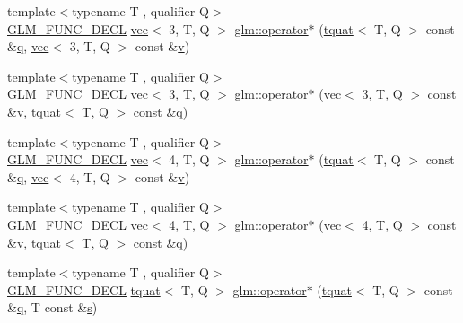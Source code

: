 \begin{DoxyCompactItemize}
\item 
{\footnotesize template$<$typename T , qualifier Q$>$ }\\\hyperlink{setup_8hpp_ab2d052de21a70539923e9bcbf6e83a51}{G\+L\+M\+\_\+\+F\+U\+N\+C\+\_\+\+D\+E\+CL} \hyperlink{structglm_1_1vec}{vec}$<$ 3, T, Q $>$ \hyperlink{group__gtc__quaternion_ga01cacfba4a28b21e7af7cdbb122c4ef9}{glm\+::operator$\ast$} (\hyperlink{structglm_1_1tquat}{tquat}$<$ T, Q $>$ const \&\hyperlink{_s_d_l__opengl_8h_a8fc1e7b9baaae687804c7eed46ca09c6}{q}, \hyperlink{structglm_1_1vec}{vec}$<$ 3, T, Q $>$ const \&\hyperlink{_s_d_l__opengl_8h_a10a82eabcb59d2fcd74acee063775f90}{v})
\item 
{\footnotesize template$<$typename T , qualifier Q$>$ }\\\hyperlink{setup_8hpp_ab2d052de21a70539923e9bcbf6e83a51}{G\+L\+M\+\_\+\+F\+U\+N\+C\+\_\+\+D\+E\+CL} \hyperlink{structglm_1_1vec}{vec}$<$ 3, T, Q $>$ \hyperlink{group__gtc__quaternion_ga97f1c7e2d4ae80aad5d8813aed7d860e}{glm\+::operator$\ast$} (\hyperlink{structglm_1_1vec}{vec}$<$ 3, T, Q $>$ const \&\hyperlink{_s_d_l__opengl_8h_a10a82eabcb59d2fcd74acee063775f90}{v}, \hyperlink{structglm_1_1tquat}{tquat}$<$ T, Q $>$ const \&\hyperlink{_s_d_l__opengl_8h_a8fc1e7b9baaae687804c7eed46ca09c6}{q})
\item 
{\footnotesize template$<$typename T , qualifier Q$>$ }\\\hyperlink{setup_8hpp_ab2d052de21a70539923e9bcbf6e83a51}{G\+L\+M\+\_\+\+F\+U\+N\+C\+\_\+\+D\+E\+CL} \hyperlink{structglm_1_1vec}{vec}$<$ 4, T, Q $>$ \hyperlink{group__gtc__quaternion_ga69d38a6ce6b49b97147c26274ada8911}{glm\+::operator$\ast$} (\hyperlink{structglm_1_1tquat}{tquat}$<$ T, Q $>$ const \&\hyperlink{_s_d_l__opengl_8h_a8fc1e7b9baaae687804c7eed46ca09c6}{q}, \hyperlink{structglm_1_1vec}{vec}$<$ 4, T, Q $>$ const \&\hyperlink{_s_d_l__opengl_8h_a10a82eabcb59d2fcd74acee063775f90}{v})
\item 
{\footnotesize template$<$typename T , qualifier Q$>$ }\\\hyperlink{setup_8hpp_ab2d052de21a70539923e9bcbf6e83a51}{G\+L\+M\+\_\+\+F\+U\+N\+C\+\_\+\+D\+E\+CL} \hyperlink{structglm_1_1vec}{vec}$<$ 4, T, Q $>$ \hyperlink{group__gtc__quaternion_ga16c91c9dc2f0346faa3742888339b11d}{glm\+::operator$\ast$} (\hyperlink{structglm_1_1vec}{vec}$<$ 4, T, Q $>$ const \&\hyperlink{_s_d_l__opengl_8h_a10a82eabcb59d2fcd74acee063775f90}{v}, \hyperlink{structglm_1_1tquat}{tquat}$<$ T, Q $>$ const \&\hyperlink{_s_d_l__opengl_8h_a8fc1e7b9baaae687804c7eed46ca09c6}{q})
\item 
{\footnotesize template$<$typename T , qualifier Q$>$ }\\\hyperlink{setup_8hpp_ab2d052de21a70539923e9bcbf6e83a51}{G\+L\+M\+\_\+\+F\+U\+N\+C\+\_\+\+D\+E\+CL} \hyperlink{structglm_1_1tquat}{tquat}$<$ T, Q $>$ \hyperlink{group__gtc__quaternion_ga603ee29c61884b9438d5eae0c548b891}{glm\+::operator$\ast$} (\hyperlink{structglm_1_1tquat}{tquat}$<$ T, Q $>$ const \&\hyperlink{_s_d_l__opengl_8h_a8fc1e7b9baaae687804c7eed46ca09c6}{q}, T const \&\hyperlink{_s_d_l__opengl_8h_a4af680a6c683f88ed67b76f207f2e6e4}{s})

\end{DoxyCompactItemize}
